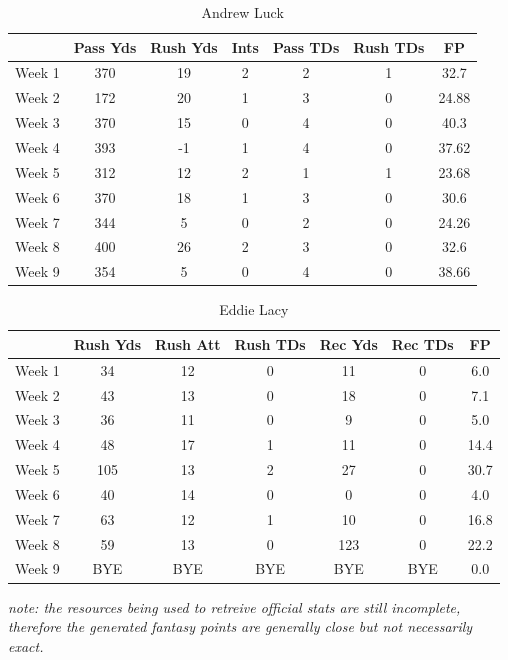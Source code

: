 \documentclass{article}
\begin{document}
    \begin{table}[h,t]
        \caption{ Andrew Luck }
        \begin{tabular}{ l|ccccc|c| }
            \hline
 & Pass Yds & Rush Yds & Ints & Pass TDs & Rush TDs & FP\\
            \hline \hline
Week 1 & 370 & 19 & 2 & 2 & 1 & 32.7\\
Week 2 & 172 & 20 & 1 & 3 & 0 & 24.88\\
Week 3 & 370 & 15 & 0 & 4 & 0 & 40.3\\
Week 4 & 393 & -1 & 1 & 4 & 0 & 37.62\\
Week 5 & 312 & 12 & 2 & 1 & 1 & 23.68\\
Week 6 & 370 & 18 & 1 & 3 & 0 & 30.6\\
Week 7 & 344 & 5 & 0 & 2 & 0 & 24.26\\
Week 8 & 400 & 26 & 2 & 3 & 0 & 32.6\\
Week 9 & 354 & 5 & 0 & 4 & 0 & 38.66\\
            \hline
        \end{tabular}
    \end{table}
    \begin{table}[h,t]
        \caption{ Eddie Lacy }
        \begin{tabular}{ l|ccccc|c| }
            \hline
 & Rush Yds & Rush Att & Rush TDs & Rec Yds & Rec TDs & FP\\
            \hline \hline
Week 1 & 34 & 12 & 0 & 11 & 0 & 6.0\\
Week 2 & 43 & 13 & 0 & 18 & 0 & 7.1\\
Week 3 & 36 & 11 & 0 & 9 & 0 & 5.0\\
Week 4 & 48 & 17 & 1 & 11 & 0 & 14.4\\
Week 5 & 105 & 13 & 2 & 27 & 0 & 30.7\\
Week 6 & 40 & 14 & 0 & 0 & 0 & 4.0\\
Week 7 & 63 & 12 & 1 & 10 & 0 & 16.8\\
Week 8 & 59 & 13 & 0 & 123 & 0 & 22.2\\
Week 9 & BYE & BYE & BYE & BYE & BYE & 0.0\\
            \hline
        \end{tabular}
    \end{table}

    \textit{note: the resources being used to retreive official stats are still incomplete, therefore the generated fantasy points are generally close but not necessarily exact.}
\end{document}
